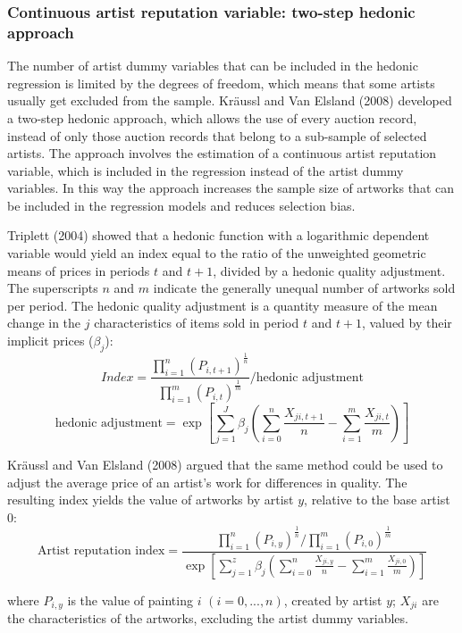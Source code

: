 \documentclass[12pt,]{article}
\begin{document}
\subsubsection{Continuous artist reputation variable: two-step hedonic
approach}\label{continuous-artist-reputation-variable-two-step-hedonic-approach}

The number of artist dummy variables that can be included in the hedonic
regression is limited by the degrees of freedom, which means that some
artists usually get excluded from the sample. Kräussl and Van Elsland
(2008) developed a two-step hedonic approach, which allows the use of
every auction record, instead of only those auction records that belong
to a sub-sample of selected artists. The approach involves the
estimation of a continuous artist reputation variable, which is included
in the regression instead of the artist dummy variables. In this way the
approach increases the sample size of artworks that can be included in
the regression models and reduces selection bias.

Triplett (2004) showed that a hedonic function with a logarithmic
dependent variable would yield an index equal to the ratio of the
unweighted geometric means of prices in periods \(t\) and \(t+1\),
divided by a hedonic quality adjustment. The superscripts \(n\) and
\(m\) indicate the generally unequal number of artworks sold per period.
The hedonic quality adjustment is a quantity measure of the mean change
in the \(j\) characteristics of items sold in period \(t\) and \(t+1\),
valued by their implicit prices (\(\beta_j\)):
\[Index = \frac{\prod_{i=1}^n (P_{i,t+1})^\frac{1}{n}} {\prod_{i=1}^m (P_{i,t})^\frac{1}{m}} / \text{hedonic adjustment} \]
\[\text{hedonic adjustment} = \exp \left[\sum_{j=1}^J\beta_j(\sum_{i=0}^n \frac{X_{ji,t+1}}{n}- \sum_{i=1}^m \frac{X_{ji,t}}{m})\right]\]

Kräussl and Van Elsland (2008) argued that the same method could be used
to adjust the average price of an artist's work for differences in
quality. The resulting index yields the value of artworks by artist
\(y\), relative to the base artist \(0\):
\[\text{Artist reputation index} = \frac{\prod_{i=1}^n (P_{i,y})^\frac{1}{n} / \prod_{i=1}^m (P_{i,0})^\frac{1}{m}} {\exp \left[\sum_{j=1}^z \beta_j(\sum_{i=0}^n \frac{X_{ji,y}}{n} - \sum_{i=1}^m  \frac{X_{ji,0}}{m}) \right]} \]

where \(P_{i,y}\) is the value of painting \(i\) \((i=0,..., n)\),
created by artist \(y\); \(X_{ji}\) are the characteristics of the
artworks, excluding the artist dummy variables.
\end{document}

